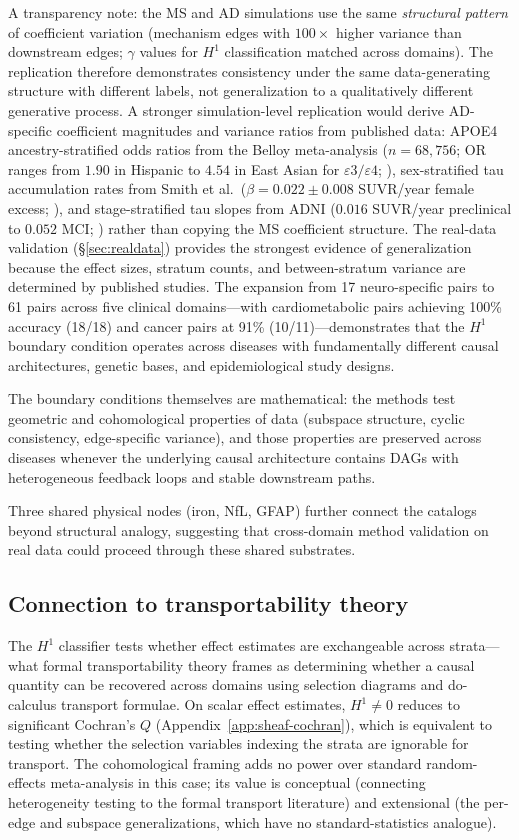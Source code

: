 \documentclass{article}
\begin{document}
A transparency note: the MS and AD simulations use the same \emph{structural pattern} of coefficient variation (mechanism edges with $100\times$ higher variance than downstream edges; $\gamma$ values for $H^1$ classification matched across domains).
The replication therefore demonstrates consistency under the same data-generating structure with different labels, not generalization to a qualitatively different generative process.
A stronger simulation-level replication would derive AD-specific coefficient magnitudes and variance ratios from published data: APOE4 ancestry-stratified odds ratios from the Belloy meta-analysis ($n = 68{,}756$; OR ranges from $1.90$ in Hispanic to $4.54$ in East Asian for $\varepsilon3/\varepsilon4$; \citealp{belloy2023apoe}), sex-stratified tau accumulation rates from Smith et al.\ ($\beta = 0.022 \pm 0.008$ SUVR/year female excess; \citealp{smith2020tau}), and stage-stratified tau slopes from ADNI ($0.016$ SUVR/year preclinical to $0.052$ MCI; \citealp{smith2020tau}) rather than copying the MS coefficient structure.
The real-data validation (\S\ref{sec:realdata}) provides the strongest evidence of generalization because the effect sizes, stratum counts, and between-stratum variance are determined by published studies.
The expansion from 17 neuro-specific pairs to 61 pairs across five clinical domains---with cardiometabolic pairs achieving 100\% accuracy (18/18) and cancer pairs at 91\% (10/11)---demonstrates that the $H^1$ boundary condition operates across diseases with fundamentally different causal architectures, genetic bases, and epidemiological study designs.

The boundary conditions themselves are mathematical: the methods test geometric and cohomological properties of data (subspace structure, cyclic consistency, edge-specific variance), and those properties are preserved across diseases whenever the underlying causal architecture contains DAGs with heterogeneous feedback loops and stable downstream paths.

Three shared physical nodes (iron, NfL, GFAP) further connect the catalogs beyond structural analogy, suggesting that cross-domain method validation on real data could proceed through these shared substrates.

\subsection{Connection to transportability theory}

The $H^1$ classifier tests whether effect estimates are exchangeable across strata---what formal transportability theory frames as determining whether a causal quantity can be recovered across domains using selection diagrams and do-calculus transport formulae.
On scalar effect estimates, $H^1 \neq 0$ reduces to significant Cochran's $Q$ (Appendix~\ref{app:sheaf-cochran}), which is equivalent to testing whether the selection variables indexing the strata are ignorable for transport.
The cohomological framing adds no power over standard random-effects meta-analysis in this case; its value is conceptual (connecting heterogeneity testing to the formal transport literature) and extensional (the per-edge and subspace generalizations, which have no standard-statistics analogue).
\end{document}
